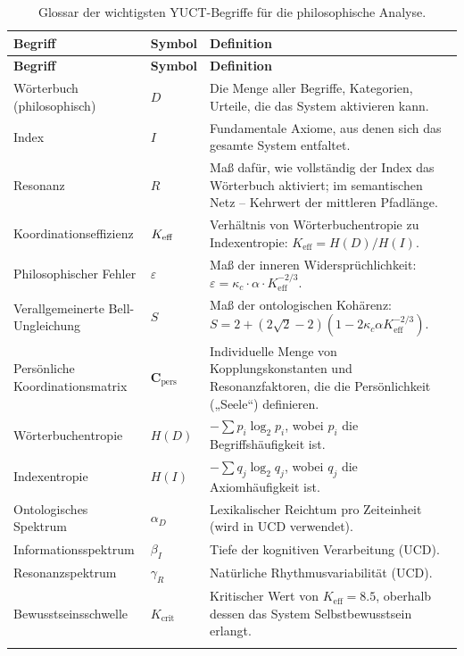 \documentclass[12pt,a4paper]{article}
\newcommand{\kappac}{\kappa_c}
\newcommand{\eps}{\varepsilon}
\newcommand{\Cpers}{\mathbf{C}_{\text{pers}}}
\begin{document}
	\begin{longtable}{p{3.5cm}p{5cm}p{4cm}}
		\toprule
		\textbf{Begriff} & \textbf{Symbol} & \textbf{Definition} \\
		\midrule
		\endfirsthead
		\toprule
		\textbf{Begriff} & \textbf{Symbol} & \textbf{Definition} \\
		\midrule
		\endhead
		Wörterbuch (philosophisch) & \(D\) & Die Menge aller Begriffe, Kategorien, Urteile, die das System aktivieren kann. \\
		Index & \(I\) & Fundamentale Axiome, aus denen sich das gesamte System entfaltet. \\
		Resonanz & \(R\) & Maß dafür, wie vollständig der Index das Wörterbuch aktiviert; im semantischen Netz – Kehrwert der mittleren Pfadlänge. \\
		Koordinationseffizienz & \(\Keff\) & Verhältnis von Wörterbuchentropie zu Indexentropie: \(K_{\mathrm{eff}} = H(D)/H(I)\). \\
		Philosophischer Fehler & \(\eps\) & Maß der inneren Widersprüchlichkeit: \(\eps = \kappac \cdot \alpha \cdot K_{\mathrm{eff}}^{-2/3}\). \\
		Verallgemeinerte Bell-Ungleichung & \(S\) & Maß der ontologischen Kohärenz: \(S = 2 + (2\sqrt{2}-2)(1 - 2\kappac\alpha K_{\mathrm{eff}}^{-2/3})\). \\
		Persönliche Koordinationsmatrix & \(\Cpers\) & Individuelle Menge von Kopplungskonstanten und Resonanzfaktoren, die die Persönlichkeit („Seele“) definieren. \\
		Wörterbuchentropie & \(H(D)\) & \( -\sum p_i \log_2 p_i\), wobei \(p_i\) die Begriffshäufigkeit ist. \\
		Indexentropie & \(H(I)\) & \( -\sum q_j \log_2 q_j\), wobei \(q_j\) die Axiomhäufigkeit ist. \\
		Ontologisches Spektrum & \(\alpha_D\) & Lexikalischer Reichtum pro Zeiteinheit (wird in UCD verwendet). \\
		Informationsspektrum & \(\beta_I\) & Tiefe der kognitiven Verarbeitung (UCD). \\
		Resonanzspektrum & \(\gamma_R\) & Natürliche Rhythmusvariabilität (UCD). \\
		Bewusstseinsschwelle & \(K_{\mathrm{crit}}\) & Kritischer Wert von \(K_{\mathrm{eff}} = 8.5\), oberhalb dessen das System Selbstbewusstsein erlangt. \\
		\bottomrule
		\caption{Glossar der wichtigsten YUCT-Begriffe für die philosophische Analyse.}
		\label{tab:glossary}
	\end{longtable}
	
\end{document}

